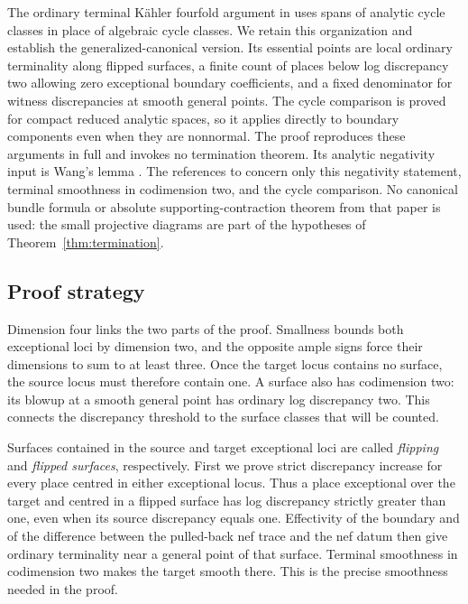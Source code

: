 The ordinary terminal K\"ahler fourfold argument in
\cite[Section~4]{OrdinaryKahler} uses spans of analytic cycle classes
in place of algebraic cycle classes. We retain this organization and
establish the generalized-canonical version. Its essential points are
local ordinary terminality along flipped surfaces, a finite count of
places below log discrepancy two allowing zero exceptional boundary
coefficients, and a fixed denominator for witness discrepancies at
smooth general points. The cycle comparison is proved for compact
reduced analytic spaces, so it applies directly to boundary components
even when they are nonnormal. The proof reproduces these arguments
in full and invokes no termination theorem. Its analytic negativity
input is Wang's lemma \cite[Lemma~1.3 and Appendices~A--B]{Wang2021}.
The references to \cite{OrdinaryKahler} concern only this negativity
statement, terminal smoothness in codimension two, and the cycle
comparison. No canonical bundle formula or absolute supporting-contraction
theorem from that paper is used: the small projective diagrams are part
of the hypotheses of Theorem~\ref{thm:termination}.

\subsection{Proof strategy}

Dimension four links the two parts of the proof. Smallness bounds both
exceptional loci by dimension two, and the opposite ample signs force
their dimensions to sum to at least three. Once the target locus
contains no surface, the source locus must therefore contain one.
A surface also has codimension two: its blowup at a smooth general
point has ordinary log discrepancy two. This connects the discrepancy
threshold to the surface classes that will be counted.

Surfaces contained in the source and target exceptional loci are
called \emph{flipping} and \emph{flipped surfaces}, respectively.
First we prove strict discrepancy increase for every place centred
in either exceptional locus. Thus a place exceptional over the target
and centred in a flipped surface has log discrepancy strictly greater
than one, even when its source discrepancy equals one. Effectivity of
the boundary and of the difference between the pulled-back nef trace
and the nef datum then give ordinary terminality near a general point
of that surface. Terminal smoothness in codimension two makes the
target smooth there. This is the precise smoothness needed in the proof.


